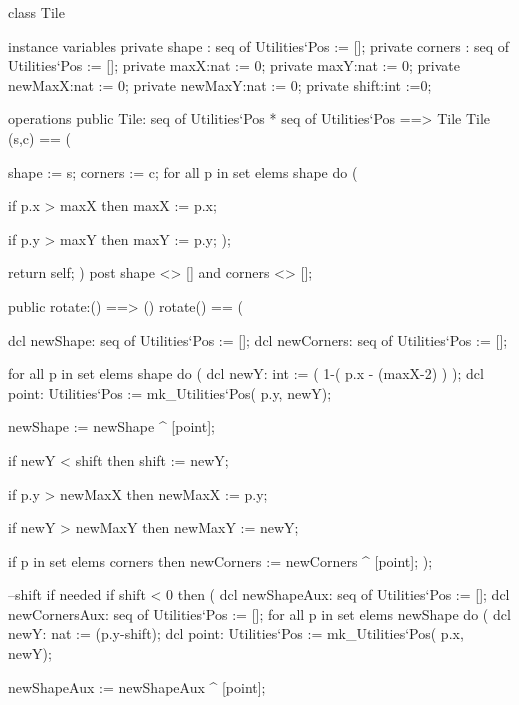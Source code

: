 \begin{vdm_al}
class Tile

  instance variables
    private shape : seq of Utilities`Pos := [];
    private corners : seq of Utilities`Pos := [];
    private maxX:nat := 0;
    private maxY:nat := 0;
    private newMaxX:nat := 0;
    private newMaxY:nat := 0;
    private shift:int :=0;
    
  operations
    public Tile: seq of Utilities`Pos * seq of Utilities`Pos ==> Tile
    Tile (s,c) == (
    
      shape := s;
      corners := c;
      for all p in set elems shape do (
            
                if p.x > maxX then
          maxX := p.x;
          
        if p.y > maxY then
          maxY := p.y;
            );
      
      return self;
    )
    post shape <> [] and corners <> [];
    
        public rotate:() ==> ()
        rotate() == (
        
          dcl newShape: seq of Utilities`Pos := [];
          dcl newCorners: seq of Utilities`Pos := [];
          
          for all p in set elems shape do (
            dcl newY: int := ( 1-( p.x - (maxX-2) ) );
            dcl point: Utilities`Pos := mk_Utilities`Pos( p.y, newY);
            
            newShape := newShape ^ [point];
            
            if newY < shift then
              shift := newY;
            
                if p.y > newMaxX then
          newMaxX := p.y;
          
        if newY > newMaxY then
          newMaxY := newY;
        
        if p in set elems corners then
              newCorners := newCorners ^ [point];
            );
            
            --shift if needed
            if shift < 0 then (
              dcl newShapeAux: seq of Utilities`Pos := [];
            dcl newCornersAux: seq of Utilities`Pos := [];
              for all p in set elems newShape do (
              dcl newY: nat := (p.y-shift);
              dcl point: Utilities`Pos := mk_Utilities`Pos( p.x, newY);
              
              newShapeAux := newShapeAux ^ [point];
              

\end{vdm_al}
